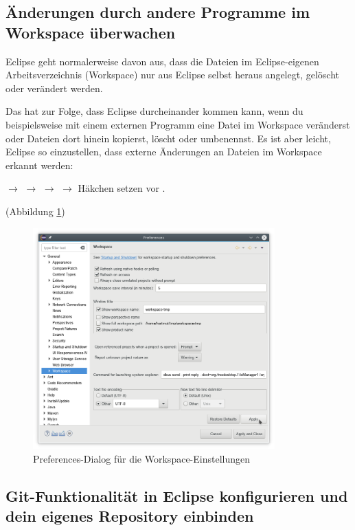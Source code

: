 \subsection{Änderungen durch andere Programme im Workspace überwachen}

Eclipse geht normalerweise davon aus, dass die Dateien im Eclipse-eigenen
Arbeitsverzeichnis (Workspace) nur aus Eclipse selbst heraus angelegt, gelöscht
oder verändert werden.

Das hat zur Folge, dass Eclipse durcheinander kommen kann, wenn du
beispielsweise mit einem externen Programm eine Datei im Workspace veränderst
oder Dateien dort hinein kopierst, löscht oder umbenennst.
Es ist aber leicht, Eclipse so einzustellen, dass externe Änderungen an Dateien
im Workspace erkannt werden:

 $\rightarrow$  $\rightarrow$
 $\rightarrow$  $\rightarrow$
Häkchen setzen vor .

(Abbildung \ref{fig:eclipse-workspace-preferences}) 

\begin{figure}[h]
  \centering
  \includegraphics[width=0.83\textwidth]{./inf/SEKII/01_Vorbereitung/Eclipse-Workspace-Preferences.png}
  \caption{Preferences-Dialog für die Workspace-Einstellungen}
  \label{fig:eclipse-workspace-preferences}
\end{figure}


\subsection{Git-Funktionalität in Eclipse konfigurieren und dein eigenes
Repository einbinden}

